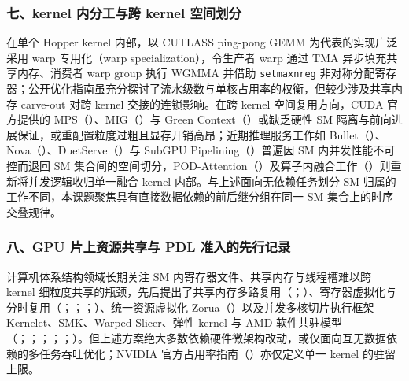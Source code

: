 \subsubsection*{七、kernel 内分工与跨 kernel 空间划分}

在单个 Hopper kernel 内部，以 CUTLASS ping-pong GEMM 为代表的实现广泛采用 warp 专用化（warp specialization），令生产者 warp 通过 TMA 异步填充共享内存、消费者 warp group 执行 WGMMA 并借助 \texttt{setmaxnreg} 非对称分配寄存器；公开优化指南虽充分探讨了流水级数与单核占用率的权衡，但较少涉及共享内存 carve-out 对跨 kernel 交接的连锁影响。在跨 kernel 空间复用方向，CUDA 官方提供的 MPS（）、MIG（）与 Green Context（）或缺乏硬性 SM 隔离与前向进展保证，或重配置粒度过粗且显存开销高昂；近期推理服务工作如 Bullet（）、Nova（）、DuetServe（）与 SubGPU Pipelining（）普遍因 SM 内并发性能不可控而退回 SM 集合间的空间切分，POD-Attention（）及算子内融合工作（）则重新将并发逻辑收归单一融合 kernel 内部。与上述面向无依赖任务划分 SM 归属的工作不同，本课题聚焦具有直接数据依赖的前后继分组在同一 SM 集合上的时序交叠规律。

\subsubsection*{八、GPU 片上资源共享与 PDL 准入的先行记录}

计算机体系结构领域长期关注 SM 内寄存器文件、共享内存与线程槽难以跨 kernel 细粒度共享的瓶颈，先后提出了共享内存多路复用（；）、寄存器虚拟化与分时复用（；；；）、统一资源虚拟化 Zorua（）以及并发多核切片执行框架 Kernelet、SMK、Warped-Slicer、弹性 kernel 与 AMD 软件共驻模型（；；；；；）。但上述方案绝大多数依赖硬件微架构改动，或仅面向互无数据依赖的多任务吞吐优化；NVIDIA 官方占用率指南（）亦仅定义单一 kernel 的驻留上限。

